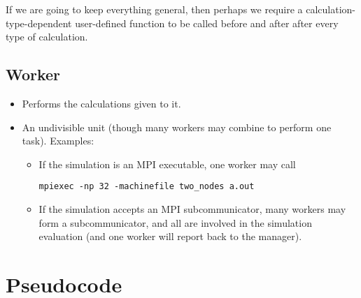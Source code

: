 \documentclass{article}
\begin{document}
If we are going to keep everything general, then perhaps we require a
calculation-type-dependent user-defined function to be called before and after
after every type of calculation.

\subsection{Worker}
\begin{itemize}
  \item Performs the calculations given to it.
  \item An undivisible unit (though many workers may combine to perform one task). Examples:
    \begin{itemize}
      \item If the simulation is an MPI executable, one worker may call 
        \begin{center}
          \texttt{mpiexec -np 32 -machinefile two\_nodes a.out}
        \end{center}
      \item If the simulation accepts an MPI subcommunicator, many workers may
        form a subcommunicator, and all are involved in the simulation
        evaluation (and one worker will report back to the manager).
    \end{itemize}
\end{itemize}


\section{Pseudocode}
\end{document}
